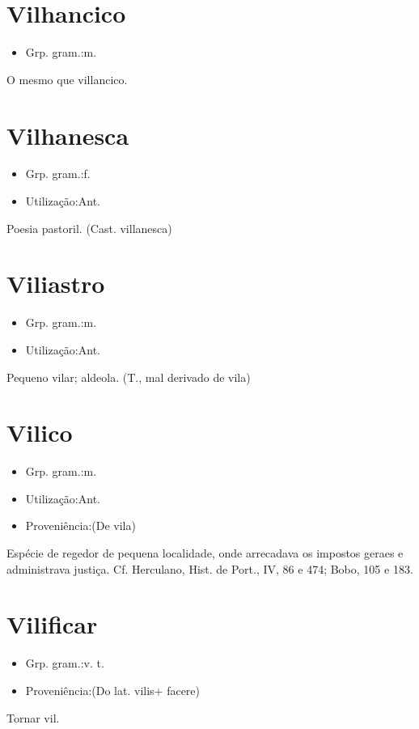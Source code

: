 \documentclass{article}
\begin{document}
\section{Vilhancico}
\begin{itemize}
\item {Grp. gram.:m.}
\end{itemize}
O mesmo que \textunderscore villancico\textunderscore .
\section{Vilhanesca}
\begin{itemize}
\item {Grp. gram.:f.}
\end{itemize}
\begin{itemize}
\item {Utilização:Ant.}
\end{itemize}
Poesia pastoril.
(Cast. \textunderscore villanesca\textunderscore )
\section{Viliastro}
\begin{itemize}
\item {Grp. gram.:m.}
\end{itemize}
\begin{itemize}
\item {Utilização:Ant.}
\end{itemize}
Pequeno vilar; aldeola.
(T., mal derivado de \textunderscore vila\textunderscore )
\section{Vilico}
\begin{itemize}
\item {Grp. gram.:m.}
\end{itemize}
\begin{itemize}
\item {Utilização:Ant.}
\end{itemize}
\begin{itemize}
\item {Proveniência:(De \textunderscore vila\textunderscore )}
\end{itemize}
Espécie de regedor de pequena localidade, onde arrecadava os impostos geraes e administrava justiça. Cf. Herculano, \textunderscore Hist. de Port.\textunderscore , IV, 86 e 474; \textunderscore Bobo\textunderscore , 105 e 183.
\section{Vilificar}
\begin{itemize}
\item {Grp. gram.:v. t.}
\end{itemize}
\begin{itemize}
\item {Proveniência:(Do lat. \textunderscore vilis\textunderscore  + \textunderscore facere\textunderscore )}
\end{itemize}
Tornar vil.
\end{document}
